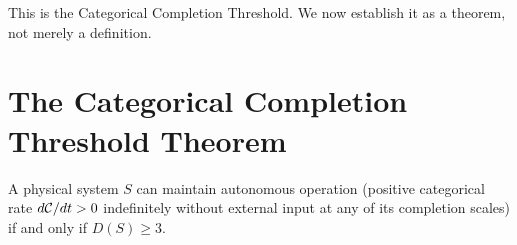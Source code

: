This is the Categorical Completion Threshold. We now establish it as a theorem,
not merely a definition.

\section{The Categorical Completion Threshold Theorem}
\label{sec:completion_threshold}

\begin{theorem}
\label{thm:completion_threshold}
A physical system $S$ can maintain autonomous operation (positive categorical
rate $d\mathcal{C}/dt > 0$ indefinitely without external input at any of its
completion scales) if and only if $D(S) \geq 3$.
\end{theorem}

